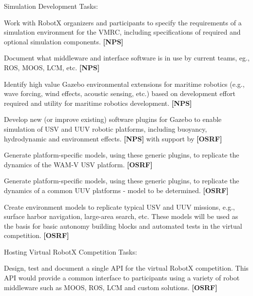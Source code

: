 \documentclass[11pt]{article}
\begin{document}

\begin{sow}
\item Simulation Development Tasks:
  \begin{sow}
  \item Work with RobotX organizers and participants to specify the requirements of a simulation environment for the VMRC, including specifications of required and optional simulation components. {\bf[NPS]}
    \begin{sow}
    \item Document what middleware and interface software is in use by current teams, eg., ROS, MOOS, LCM, etc.  {\bf[NPS]}
    \item Identify high value Gazebo environmental extensions for maritime robotics (e.g., wave forcing, wind effects, acoustic sensing, etc.) based on development effort required and utility for maritime robotics development.  {\bf[NPS]}
    \end{sow}
  \item Develop new (or improve existing) software plugins for Gazebo to enable simulation of USV and UUV robotic platforms, including buoyancy, hydrodynamic and environment effects. {\bf[NPS]} with support by {\bf[OSRF]}
    \begin{sow}
      \item Generate platform-specific models, using these generic plugins, to replicate the dynamics of the WAM-V USV platform. {\bf[OSRF]}
      \item Generate platform-specific models, using these generic plugins, to replicate the dynamics of a common UUV platforms - model to be determined. {\bf[OSRF]}
    \end{sow}
  \item Create environment models to replicate typical USV and UUV missions, e.g., surface harbor navigation, large-area search, etc.  These models will be used as the basis for basic autonomy building blocks and automated tests in the virtual competition. {\bf[OSRF]}
  \end{sow}
\item Hosting Virtual RobotX Competition Tasks:
  \begin{sow}
  \item Design, test and document a single API for the virtual RobotX competition.  This API would provide a common interface to participants using a variety of robot middleware such as MOOS, ROS, LCM and custom solutions. {\bf[OSRF]}

\end{sow}
\end{sow}
\end{document}
